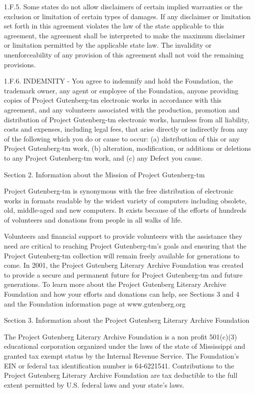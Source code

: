 \begin{PGtext}
1.F.5.  Some states do not allow disclaimers of certain implied
warranties or the exclusion or limitation of certain types of damages.
If any disclaimer or limitation set forth in this agreement violates the
law of the state applicable to this agreement, the agreement shall be
interpreted to make the maximum disclaimer or limitation permitted by
the applicable state law.  The invalidity or unenforceability of any
provision of this agreement shall not void the remaining provisions.

1.F.6.  INDEMNITY - You agree to indemnify and hold the Foundation, the
trademark owner, any agent or employee of the Foundation, anyone
providing copies of Project Gutenberg-tm electronic works in accordance
with this agreement, and any volunteers associated with the production,
promotion and distribution of Project Gutenberg-tm electronic works,
harmless from all liability, costs and expenses, including legal fees,
that arise directly or indirectly from any of the following which you do
or cause to occur: (a) distribution of this or any Project Gutenberg-tm
work, (b) alteration, modification, or additions or deletions to any
Project Gutenberg-tm work, and (c) any Defect you cause.


Section  2.  Information about the Mission of Project Gutenberg-tm

Project Gutenberg-tm is synonymous with the free distribution of
electronic works in formats readable by the widest variety of computers
including obsolete, old, middle-aged and new computers.  It exists
because of the efforts of hundreds of volunteers and donations from
people in all walks of life.

Volunteers and financial support to provide volunteers with the
assistance they need are critical to reaching Project Gutenberg-tm's
goals and ensuring that the Project Gutenberg-tm collection will
remain freely available for generations to come.  In 2001, the Project
Gutenberg Literary Archive Foundation was created to provide a secure
and permanent future for Project Gutenberg-tm and future generations.
To learn more about the Project Gutenberg Literary Archive Foundation
and how your efforts and donations can help, see Sections 3 and 4
and the Foundation information page at www.gutenberg.org


Section 3.  Information about the Project Gutenberg Literary Archive
Foundation

The Project Gutenberg Literary Archive Foundation is a non profit
501(c)(3) educational corporation organized under the laws of the
state of Mississippi and granted tax exempt status by the Internal
Revenue Service.  The Foundation's EIN or federal tax identification
number is 64-6221541.  Contributions to the Project Gutenberg
Literary Archive Foundation are tax deductible to the full extent
permitted by U.S. federal laws and your state's laws.


\end{PGtext}
